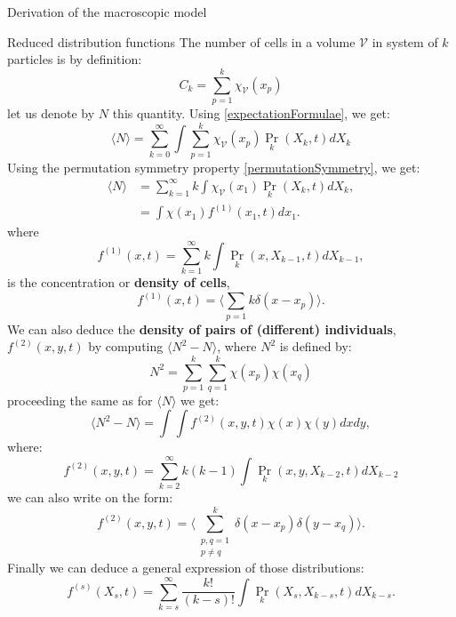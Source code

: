 \begin{paragraph}{Derivation of the macroscopic model}
\begin{paragraph}{Reduced distribution functions}
The number of  cells in a volume $\mathcal{V}$ in system of $k$ particles is by definition: 
$$ C_k = \sum_{p=1}^{k} \chi_{\mathcal{V}}(x_p)$$
let us denote by $N$ this quantity. Using \eqref{expectationFormulae}, we get: 
\begin{equation}
\langle N \rangle =  \sum_{k=0}^{\infty} \int \sum_{p=1}^{k} \chi_{\mathcal{V}}(x_p) \Pr_k(X_k, t) dX_k
\end{equation}
 Using the permutation symmetry property \eqref{permutationSymmetry}, we get: 
 \begin{align}
	 \langle N \rangle & = \sum_{k=1}^{\infty} k \int  \chi_{\mathcal{V}}(x_1) \Pr_k(X_k, t) dX_k, \\[5pt]
	 & =  \int \chi(x_1) f^{(1)}(x_1, t)dx_1 .
	\end{align}
where 
\begin{equation}
\label{firstReducedFunction}
f^{(1)}(x,t) =  \sum_{k=1}^{\infty} k \int \Pr_k(x, X_{k-1}, t)dX_{k-1},
\end{equation}
is the concentration or \textbf{density of cells}, 
\begin{equation}
f^{(1)}(x,t) = \langle \sum_{p=1}{k} \delta(x-x_p)\rangle .
\end{equation}
We can also deduce the \textbf{density of pairs of (different) individuals}, $f^{(2)}(x,y,t)$ by computing $\langle N^2 - N \rangle$, where $N^2$ is defined by: 
$$ N^2 =  \sum_{p=1}^{k} \sum_{q=1}^{k} \chi(x_p) \chi(x_q) $$
proceeding the same as for $\langle N \rangle$ we get: 
\begin{equation}
	\langle N^2 - N \rangle = \int \int f^{(2)}(x, y, t) \chi(x)\chi(y) dxdy,
\end{equation}
where: 
\begin{equation}
f^{(2)}(x,y,t) = \sum_{k=2}^{\infty} k(k-1) \int \Pr_k(x, y, X_{k-2}, t)dX_{k-2}
\end{equation} 
we can also write on the form: 
\begin{equation}
f^{(2)}(x,y,t) = \langle \sum_{\substack{p, q=1 \\ p \neq q}}^{k} \delta(x - x_p) \delta(y - x_q) \rangle.
\end{equation} 
Finally we can deduce a general expression of those distributions:
\begin{equation}
f^{(s)}(X_s,t) = \sum_{k=s}^{\infty} \dfrac{k!}{(k-s)!} \int \Pr_k(X_s, X_{k-s},t)dX_{k-s}.
\end{equation}
\end{paragraph}


\end{paragraph}
